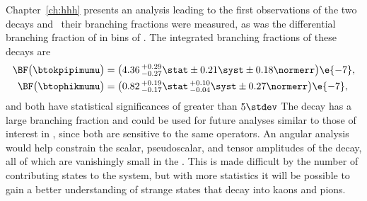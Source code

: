


Chapter~\ref{ch:hhh} presents an analysis leading to the first observations of the two decays
\btokpipimumu and \btophikmumu\, their branching fractions were measured, as was the differential
branching fraction of \btokpipimumu in bins of \qsq.
The integrated branching fractions of these decays are
\begin{align*}
  \BF\big( \btokpipimumu \big)&=
  \big(4.36\,^{+0.29}_{-0.27}\stat\pm0.21\syst\pm0.18\normerr\big)\e{-7}, \\
  \BF\big(\btophikmumu\big)&=
  \big(0.82\,^{+0.19}_{-0.17}\stat\,^{+0.10}_{-0.04}\syst\pm0.27\normerr\big)\e{-7},
\end{align*}
and both have statistical significances of greater than $5\stdev$
The decay \btokpipimumu has a large branching fraction and could be used for future analyses
similar to those of interest in \btokstrmumu, since both are sensitive to the same operators.
An angular analysis would help constrain the scalar, pseudoscalar, and tensor amplitudes of the
decay, all of which are vanishingly small in the \sm.
This is made difficult by the number of contributing states to the \kpipi system,
but with more statistics it will be possible to gain a better understanding of
strange states that decay into kaons and pions.


